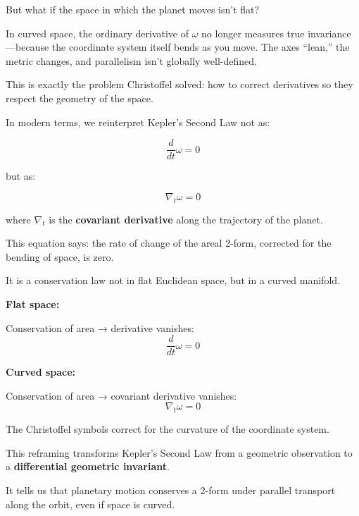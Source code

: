 \bigskip

But what if the space in which the planet moves isn’t flat?

\medskip

In curved space, the ordinary derivative of \( \omega \) no longer measures true invariance—because the coordinate system itself bends as you move. The axes “lean,” the metric changes, and parallelism isn’t globally well-defined.

This is exactly the problem Christoffel solved: how to correct derivatives so they respect the geometry of the space.

\bigskip

In modern terms, we reinterpret Kepler’s Second Law not as:

\[
\frac{d}{dt} \omega = 0
\]

but as:

\[
\nabla_t \omega = 0
\]

where \( \nabla_t \) is the \textbf{covariant derivative} along the trajectory of the planet.

\medskip

This equation says: the rate of change of the areal 2-form, corrected for the bending of space, is zero.

It is a conservation law not in flat Euclidean space, but in a curved manifold.

\bigskip

\begin{tcolorbox}[colback=gray!5!white, colframe=black, title=\textbf{Sidebar: Kepler’s Law under Covariant Derivative}, fonttitle=\bfseries, arc=1.5mm, boxrule=0.4pt]

\textbf{Flat space:}

Conservation of area → derivative vanishes:
\[
\frac{d}{dt} \omega = 0
\]

\textbf{Curved space:}

Conservation of area → covariant derivative vanishes:
\[
\nabla_t \omega = 0
\]

The Christoffel symbols correct for the curvature of the coordinate system.

\end{tcolorbox}

\bigskip

This reframing transforms Kepler’s Second Law from a geometric observation to a \textbf{differential geometric invariant}.

It tells us that planetary motion conserves a 2-form under parallel transport along the orbit, even if space is curved.

